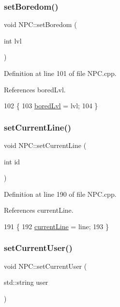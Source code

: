 \subsubsection{\texorpdfstring{set\+Boredom()}{setBoredom()}}
{\footnotesize\ttfamily void N\+P\+C\+::set\+Boredom (\begin{DoxyParamCaption}\item[{int}]{lvl }\end{DoxyParamCaption})}



Definition at line 101 of file N\+P\+C.\+cpp.



References bored\+Lvl.


\begin{DoxyCode}
102 \{
103     \hyperlink{class_n_p_c_a1f67b7dfca770653fc523dfc558e7fdf}{boredLvl} = lvl;
104 \}
\end{DoxyCode}
\mbox{\label{class_n_p_c_ac2143e6bbc303d3fbe65c5603746557e}} 
\subsubsection{\texorpdfstring{set\+Current\+Line()}{setCurrentLine()}}
{\footnotesize\ttfamily void N\+P\+C\+::set\+Current\+Line (\begin{DoxyParamCaption}\item[{int}]{id }\end{DoxyParamCaption})}



Definition at line 190 of file N\+P\+C.\+cpp.



References current\+Line.


\begin{DoxyCode}
191 \{
192     \hyperlink{class_n_p_c_a0969e4514a21f3b2966a24d78e9e3343}{currentLine} = line;
193 \}
\end{DoxyCode}
\mbox{\label{class_n_p_c_a30076f45e31741e86a79f280eca215cb}} 
\subsubsection{\texorpdfstring{set\+Current\+User()}{setCurrentUser()}}
{\footnotesize\ttfamily void N\+P\+C\+::set\+Current\+User (\begin{DoxyParamCaption}\item[{std\+::string}]{user }\end{DoxyParamCaption})}



